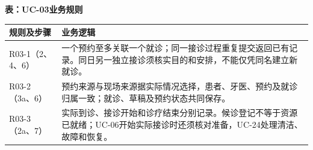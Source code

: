 \documentclass[UTF8,a4paper,zihao=-4,fontset=none]{ctexart}
\begin{document}
\medskip
{\small\setlength{\tabcolsep}{3pt}\renewcommand{\arraystretch}{1.10}
\noindent\textbf{表\thetable：UC-03业务规则}\par\smallskip
\noindent\begin{tabular}{@{}>{\raggedright\arraybackslash}p{3.4cm}>{\raggedright\arraybackslash}p{12.3cm}@{}}
\toprule
规则及步骤 & 业务逻辑 \\ \midrule
R03-1（2、4、6） & 一个预约至多关联一个就诊；同一接诊过程重复提交返回已有记录。同日另一独立接诊须核实目的和安排，不能仅凭同名建立新就诊。 \\
R03-2（3a、6） & 预约来源与现场来源据实际情况选择，患者、牙医、预约及就诊归属一致；就诊、草稿及预约状态共同保存。 \\
R03-3（2a、7） & 实际到诊、接诊开始和诊疗结束分别记录。候诊登记不等于资源已就绪；UC-06开始实际接诊时还须核对准备，UC-24处理清洁、故障和恢复。 \\
\bottomrule
\end{tabular}\par}
\medskip
\endgroup
\clearpage
\end{document}
